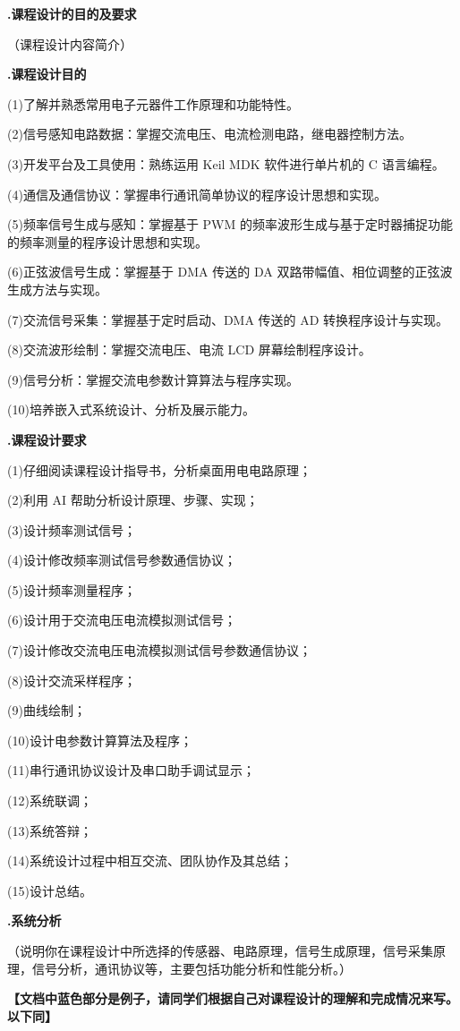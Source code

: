 \documentclass[UTF8,a4paper,zihao=-4,fontset=macnew]{ctexart}
\newcommand{\notepara}[2]{%
  {\setlength{\leftskip}{2em}\setlength{\parindent}{0pt}\color{#1}#2\par}%
}
\newcommand{\bluepara}[1]{\notepara{blue}{#1}}
\newcommand{\redpara}[1]{\notepara{red}{#1}}
\newcommand{\sectiontitle}[2]{%
  \vspace*{-0.32cm}%
  {\noindent\heiti\bfseries\fontsize{18pt}{20pt}\selectfont #1.\quad #2\par}
  \vspace{0.50cm}
}
\newcommand{\subsectiontitle}[2]{%
  \vspace{0.34cm}
  {\noindent\heiti\bfseries\fontsize{16pt}{18pt}\selectfont #1.\quad #2\par}
  \vspace{0.54cm}
}
\newcommand{\itemline}[2]{%
  {\setlength{\leftskip}{2em}\setlength{\parindent}{0pt}%
  \noindent(#1)\quad #2\par}%
}
\begin{document}
\clearpage

\thispagestyle{empty}
\mbox{}
\clearpage

\pagestyle{reportbody}
\setlength{\parindent}{2em}
\linespread{1.18}\selectfont

\label{sec:purpose}
\vspace*{0.18cm}
\sectiontitle{1}{课程设计的目的及要求}
\redpara{（课程设计内容简介）}

\label{sec:purpose-goal}
\subsectiontitle{1.1}{课程设计目的}
\itemline{1}{了解并熟悉常用电子元器件工作原理和功能特性。}
\itemline{2}{信号感知电路数据：掌握交流电压、电流检测电路，继电器控制方法。}
\itemline{3}{开发平台及工具使用：熟练运用 Keil MDK 软件进行单片机的 C 语言编程。}
\itemline{4}{通信及通信协议：掌握串行通讯简单协议的程序设计思想和实现。}
\itemline{5}{频率信号生成与感知：掌握基于 PWM 的频率波形生成与基于定时器捕捉功能的频率测量的程序设计思想和实现。}
\itemline{6}{正弦波信号生成：掌握基于 DMA 传送的 DA 双路带幅值、相位调整的正弦波生成方法与实现。}
\itemline{7}{交流信号采集：掌握基于定时启动、DMA 传送的 AD 转换程序设计与实现。}
\itemline{8}{交流波形绘制：掌握交流电压、电流 LCD 屏幕绘制程序设计。}
\itemline{9}{信号分析：掌握交流电参数计算算法与程序实现。}
\itemline{10}{培养嵌入式系统设计、分析及展示能力。}

\label{sec:purpose-req}
\subsectiontitle{1.2}{课程设计要求}
\itemline{1}{仔细阅读课程设计指导书，分析桌面用电电路原理；}
\itemline{2}{利用 AI 帮助分析设计原理、步骤、实现；}
\itemline{3}{设计频率测试信号；}
\itemline{4}{设计修改频率测试信号参数通信协议；}
\itemline{5}{设计频率测量程序；}
\itemline{6}{设计用于交流电压电流模拟测试信号；}
\itemline{7}{设计修改交流电压电流模拟测试信号参数通信协议；}
\itemline{8}{设计交流采样程序；}
\itemline{9}{曲线绘制；}
\itemline{10}{设计电参数计算算法及程序；}
\itemline{11}{串行通讯协议设计及串口助手调试显示；}
\itemline{12}{系统联调；}
\itemline{13}{系统答辩；}
\itemline{14}{系统设计过程中相互交流、团队协作及其总结；}
\itemline{15}{设计总结。}

\clearpage

\label{sec:analysis}
\sectiontitle{2}{系统分析}
\redpara{（说明你在课程设计中所选择的传感器、电路原理，信号生成原理，信号采集原理，信号分析，通讯协议等，主要包括功能分析和性能分析。）}

\bluepara{\bfseries 【文档中蓝色部分是例子，请同学们根据自己对课程设计的理解和完成情况来写。以下同】}
\end{document}
